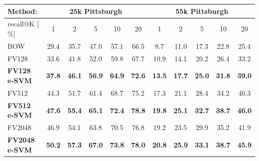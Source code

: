 \documentclass[table]{article} %
\begin{document}
			


\begin{table}[t!]
\begin{centering}
	\begin{tabularx}{0.94\linewidth}{|l|c c c c c|c c c c c|}
		\hline 
		\rowcolor{maroon!50}
		Method: & \multicolumn{5}{c|}{25k Pittsburgh} & \multicolumn{5}{c|}{55k Pittsburgh} \\
		\hline 
		\hline 
		\rowcolor{maroon!50}
		recall@K [$\%$] & 1 & 2 & 5 & 10 & 20 & 1 & 2 & 5 & 10 & 20\\
		\hline
		\rowcolor{maroon!10}
		BOW & 29.4 & 35.7 & 47.0 & 57.1 & 66.5 & 8.7 & 11.0 & 17.3 & 22.8 & 25.4  \\
        \hline
		\rowcolor{maroon!10}
		FV128         & 33.6 & 41.8 & 52.0 & 59.8 & 67.7 & 10.9 & 14.1 & 20.2 & 26.4 & 33.2 \\
		\rowcolor{maroon!10}
		\textbf{FV128 e-SVM}   & \textbf{37.8}  & \textbf{46.1} & \textbf{56.9} & \textbf{64.9} & \textbf{72.6}  &
                                 \textbf{13.5}  &  \textbf{17.7}  &  \textbf{25.0}  &  \textbf{31.8}  &  \textbf{39.0} \\
        \hline
        \rowcolor{maroon!10}
        FV512         & 44.3 & 51.7 & 61.4 & 68.7 & 75.2 & 17.3 &  21.1 &  28.4 &  34.2 &  40.3 \\
        \rowcolor{maroon!10}
        \textbf{FV512 e-SVM}   & \textbf{47.6}  & \textbf{55.4} & \textbf{65.1} & \textbf{72.4} & \textbf{78.8}  &
                                 \textbf{19.8} &  \textbf{25.1} &  \textbf{32.7}  & \textbf{38.7} &  \textbf{46.0} \\
        \hline
		\rowcolor{maroon!10}
		FV2048        & 46.9  & 54.1 & 63.8 & 70.5 & 76.8 & 19.2 & 23.5 & 29.9 &  35.2 &  41.9 \\
		\rowcolor{maroon!10}
		\textbf{FV2048 e-SVM}  & \textbf{50.2} & \textbf{57.3} & \textbf{67.0} & \textbf{73.8} & \textbf{78.0} &
        \textbf{20.8} & \textbf{25.9} & \textbf{33.1} & \textbf{38.7} & \textbf{45.9}\\
        \hline

\end{tabularx}
\end{centering}
\end{table}
\end{document}
